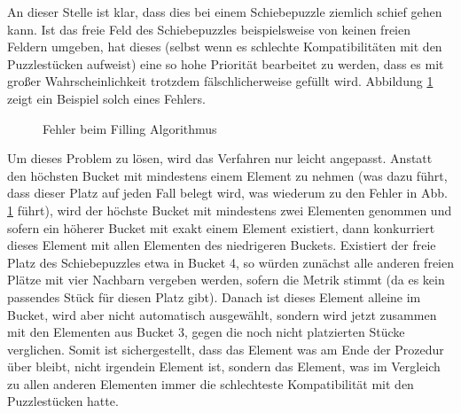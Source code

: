 \documentclass{whswinvcbook}
\begin{document}
An dieser Stelle ist klar, dass dies bei einem Schiebepuzzle ziemlich schief gehen kann. Ist das freie Feld des Schiebepuzzles beispielsweise von keinen freien Feldern umgeben, hat dieses (selbst wenn es schlechte Kompatibilitäten mit den Puzzlestücken aufweist) eine so hohe Priorität bearbeitet zu werden, dass es mit großer Wahrscheinlichkeit trotzdem fälschlicherweise gefüllt wird. Abbildung \ref{fig-dsf2} zeigt ein Beispiel solch eines Fehlers.
\begin{figure}[H]
    \centering
    \caption{Fehler beim Filling Algorithmus}
    \label{fig-dsf2}
\end{figure}
Um dieses Problem zu lösen, wird das Verfahren nur leicht angepasst. Anstatt den höchsten Bucket mit mindestens einem Element zu nehmen (was dazu führt, dass dieser Platz auf jeden Fall belegt wird, was wiederum zu den Fehler in Abb. \ref{fig-dsf2} führt), wird der höchste Bucket mit mindestens zwei Elementen genommen und sofern ein höherer Bucket mit exakt einem Element existiert, dann konkurriert dieses Element mit allen Elementen des niedrigeren Buckets. Existiert der freie Platz des Schiebepuzzles etwa in Bucket 4, so würden zunächst alle anderen freien Plätze mit vier Nachbarn vergeben werden, sofern die Metrik stimmt (da es kein passendes Stück für diesen Platz gibt). Danach ist dieses Element alleine im Bucket, wird aber nicht automatisch ausgewählt, sondern wird jetzt zusammen mit den Elementen aus Bucket 3, gegen die noch nicht platzierten Stücke verglichen. Somit ist sichergestellt, dass das Element was am Ende der Prozedur über bleibt, nicht irgendein Element ist, sondern das Element, was im Vergleich zu allen anderen Elementen immer die schlechteste Kompatibilität mit den Puzzlestücken hatte.
\end{document}
